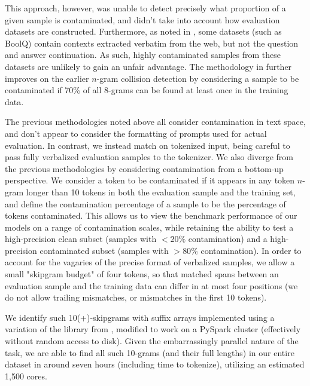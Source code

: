 \documentclass{article}
\begin{document}
This approach, however, was unable to detect precisely what proportion of a given sample is contaminated, and didn't take into account how evaluation datasets are constructed. Furthermore, as noted in \cite{palm1}, some datasets (such as BoolQ) contain contexts extracted verbatim from the web, but not the question and answer continuation. As such, highly contaminated samples from these datasets are unlikely to gain an unfair advantage.  The methodology in \cite{palm1} further improves on the earlier $n$-gram collision detection by considering a sample to be contaminated if 70\% of all 8-grams can be found at least once in the training data.

The previous methodologies noted above all consider contamination in text space, and don't appear to consider the formatting of prompts used for actual evaluation. In contrast, we instead match on tokenized input, being careful to pass fully verbalized evaluation samples to the tokenizer.  We also diverge from the previous methodologies by considering contamination from a bottom-up perspective. We consider a token to be contaminated if it appears in any token $n$-gram longer than 10 tokens in both the evaluation sample and the training set, and define the contamination percentage of a sample to be the percentage of tokens contaminated. This allows us to view the benchmark performance of our models on a range of contamination scales, while retaining the ability to test a high-precision clean subset (samples with $< 20\%$ contamination) and a high-precision contaminated subset (samples with $> 80\%$ contamination).  In order to account for the vagaries of the precise format of verbalized samples, we allow a small "skipgram budget" of four tokens, so that matched spans between an evaluation sample and the training data can differ in at most four positions (we do not allow trailing mismatches, or mismatches in the first 10 tokens).

We identify such 10(+)-skipgrams with suffix arrays implemented using a variation of the library from \cite{suffixarrays}, modified to work on a PySpark cluster (effectively without random access to disk).  Given the embarrassingly parallel nature of the task, we are able to find all such 10-grams (and their full lengths) in our entire dataset in around seven hours (including time to tokenize), utilizing an estimated 1,500 cores.
\end{document}

